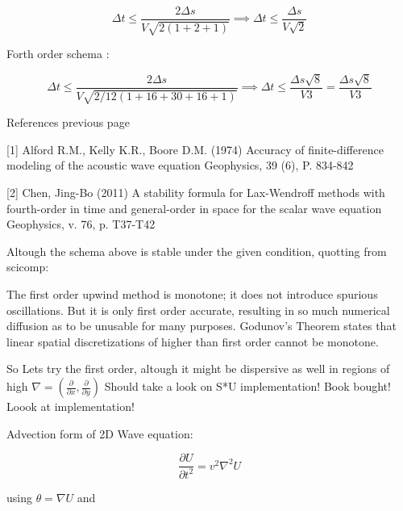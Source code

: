 \documentclass[legalpaper, 12pt]{article}
\begin{document}
$$ \Delta t \leq \frac{2 \Delta s}{ V \sqrt{2(1+2+1)}} \implies \Delta t \leq \frac{ \Delta s}{ V \sqrt{2}} $$

Forth order schema :

$$ \Delta t \leq \frac{2 \Delta s}{ V \sqrt{2/12(1+16+30+16+1)}} \implies \Delta t \leq \frac{ \Delta s \sqrt{8}}{ V 3} = \frac{ \Delta s \sqrt{8}}{ V 3}$$

\newpage

References previous page

[1] Alford R.M., Kelly K.R., Boore D.M. (1974) Accuracy of finite-difference modeling of the acoustic wave equation Geophysics, 39 (6), P. 834-842

[2] Chen, Jing-Bo (2011) A stability formula for Lax-Wendroff methods with fourth-order in time and general-order in space for the scalar wave equation Geophysics, v. 76, p. T37-T42

\newpage

Altough the schema above is stable under the given condition, quotting from scicomp:

The first order upwind method is monotone; it does not introduce spurious oscillations. But it is only first order accurate, resulting in so much numerical diffusion as to be unusable for many purposes. Godunov's Theorem states that linear spatial discretizations of higher than first order cannot be monotone.

So Lets try the first order, altough it might be dispersive as well in regions of high $ \nabla = ( \frac{\partial}{\partial x}, \frac{\partial}{\partial y} ) $ Should take a look on S*U implementation! Book bought! Loook at implementation!


\newpage


\medspace
\medspace
Advection form of 2D Wave equation:
\medspace

$$ \frac{\partial U}{\partial t ^2} = v^2 \nabla^2 U $$ 

using $\theta = \nabla U $ and 
\end{document}
